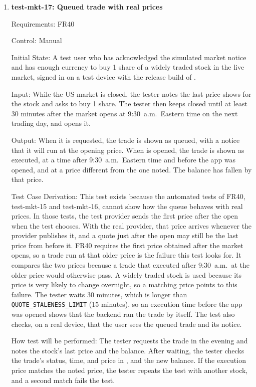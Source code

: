 \documentclass[12pt, titlepage]{article}
\begin{document}
\begin{enumerate}
How test will be performed: As in test-mkt-15, with the status of each user's
trades also read through the API.

\item{\textbf{test-mkt-17: Queued trade with real prices}\\}

Requirements: FR40

Control: Manual

Initial State: A test user who has acknowledged the simulated market notice
and has enough currency to buy 1 share of a widely traded stock in the live
market, signed in on a test device with the release build of \progname{}.

Input: While the US market is closed, the tester notes the last price
\progname{} shows for the stock and asks to buy 1 share. The tester then keeps
\progname{} closed until at least 30 minutes after the market opens at
9:30~a.m.\ Eastern time on the next trading day, and opens it.

Output: When it is requested, the trade is shown as queued, with a notice that
it will run at the opening price. When \progname{} is opened, the trade is
shown as executed, at a time after 9:30~a.m.\ Eastern time and before the app
was opened, and at a price different from the one noted. The balance has
fallen by that price.

Test Case Derivation: This test exists because the automated tests of FR40,
test-mkt-15 and test-mkt-16, cannot show how the queue behaves with real
prices. In those tests, the test provider sends the first price after the open
when the test chooses. With the real provider, that price arrives whenever the
provider publishes it, and a quote just after the open may still be the last
price from before it. FR40 requires the first price obtained after the market
opens, so a trade run at that older price is the failure this test looks for.
It compares the two prices because a trade that executed after 9:30~a.m.\ at
the older price would otherwise pass. A widely traded stock is used because its
price is very likely to change overnight, so a matching price points to this
failure. The tester waits 30 minutes, which is longer than
\texttt{QUOTE\_STALENESS\_LIMIT} (15 minutes), so an execution time before the
app was opened shows that the backend ran the trade by itself. The test also
checks, on a real device, that the user sees the queued trade and its notice.

How test will be performed: The tester requests the trade in the evening and
notes the stock's last price and the balance. After waiting, the tester checks
the trade's status, time, and price in \progname{}, and the new balance. If the
execution price matches the noted price, the tester repeats the test with
another stock, and a second match fails the test.


\end{enumerate}
\end{document}
